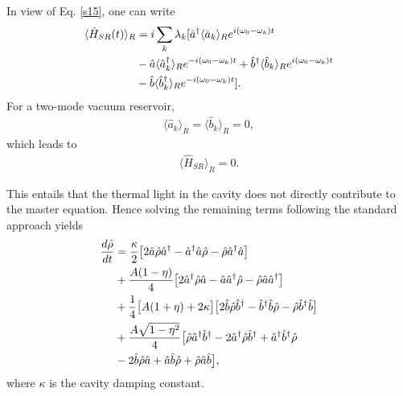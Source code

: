 \documentclass[twocolumn,showpacs,preprintnumbers,amsmath,amssymb,pra]{revtex4}
\begin{document}
In view of Eq. \eqref{s15}, one can write
\begin{align}\label{s16}\langle\hat{H}_{SR}(t)\rangle_{R}& =
i\sum_{k}\lambda_{k}[\hat{a}^{\dagger}
\langle\hat{a}_{k}\rangle_{R}e^{i(\omega_{0}-\omega_{k})t} \notag\\&-
\hat{a}\langle\hat{a}^{\dagger}_{k}\rangle_{R}e^{-i(\omega_{0}-\omega_{k})t}+
\hat{b}^{\dagger}\langle\hat{b}_{k}\rangle_{R}e^{i(\omega_{0}-\omega_{k})t}
\notag\\&-\hat{b}\langle\hat{b}^{\dagger}_{k}\rangle_{R}e^{-i(\omega_{0}-\omega_{k})t}].\end{align}
For a two-mode vacuum reservoir, 
\begin{align}\label{s17}\langle\hat{a}_{k}\rangle_{R} = \langle\hat{b}_{k}\rangle_{R} =0,\end{align} which leads to
\begin{align}\label{s18}\langle\hat{H}_{SR}\rangle_{R} = 0.\end{align}

This entails that the thermal light in the cavity does not directly contribute to the master equation. Hence solving the remaining terms following the standard approach \cite{lou} yields
\begin{align}\label{s19}\frac{d\hat{\rho}}{dt} &= \frac{\kappa}{2}
\big[2\hat{a}\hat{\rho}\hat{a}^{\dagger} -
\hat{a}^{\dagger}\hat{a}\hat{\rho} -
\hat{\rho}\hat{a}^{\dagger}\hat{a}\big] \notag\\&+
\frac{A(1-\eta)}{4} \big[2\hat{a}^{\dagger}\hat{\rho}\hat{a} -
\hat{a}\hat{a}^{\dagger}\hat{\rho} -
\hat{\rho}\hat{a}\hat{a}^{\dagger}\big] \notag\\&+
\frac{1}{4}\big[A(1+\eta)
+2\kappa\big]\big[2\hat{b}\hat{\rho}\hat{b}^{\dagger} -
\hat{b}^{\dagger}\hat{b}\hat{\rho} -
\hat{\rho}\hat{b}^{\dagger}\hat{b}\big] \notag\\ &+
\frac{A\sqrt{1-\eta^{2}}}{4}\big[\hat{\rho}\hat{a}^{\dagger}\hat{b}^{\dagger}
-2\hat{a}^{\dagger}\hat{\rho}\hat{b}^{\dagger} +
\hat{a}^{\dagger}\hat{b}^{\dagger}\hat{\rho}\notag\\&-
2\hat{b}\hat{\rho}\hat{a} + \hat{a}\hat{b}\hat{\rho} +
\hat{\rho}\hat{a}\hat{b}\big],\end{align} where $\kappa$ is the cavity damping constant.
\end{document}
